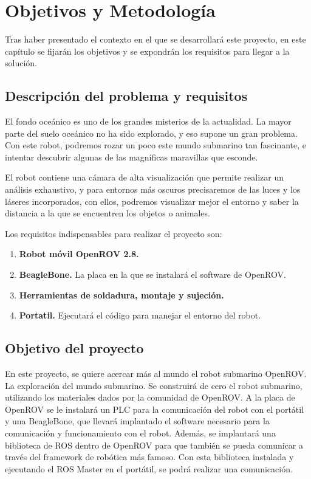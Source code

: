 \chapter{Objetivos y Metodología}
\label{cap:objetivos}
Tras haber presentado el contexto en el que se desarrollará este proyecto, en este capítulo se fijarán los objetivos y se expondrán los requisitos para llegar a la solución.
\section{Descripción del problema y requisitos}
\label{sec:descripciondelproblema}

El fondo oceánico es uno de los grandes misterios de la actualidad. La mayor parte del suelo oceánico no ha sido explorado, y eso supone un gran problema. Con este robot, podremos rozar un poco este mundo submarino tan fascinante, e intentar descubrir algunas de las magníficas maravillas que esconde.

El robot contiene una cámara de alta visualización que permite realizar un análisis exhaustivo, y para entornos más oscuros precisaremos de las luces y los láseres incorporados, con ellos, podremos visualizar mejor el entorno y saber la distancia a la que se encuentren los objetos o animales. 

Los requisitos indispensables para realizar el proyecto son:
\begin{enumerate}
\item \textbf{Robot móvil OpenROV 2.8.}
\item \textbf{BeagleBone.} La placa en la que se instalará el software de OpenROV.
\item \textbf{Herramientas de soldadura, montaje y sujeción.} 
\item \textbf{Portatil.} Ejecutará el código para manejar el entorno del robot.
\end{enumerate}

\section{Objetivo del proyecto}
\label{sec:objetivos}

En este proyecto, se quiere acercar más al mundo el robot submarino OpenROV. La exploración del mundo submarino. 
Se construirá de cero el robot submarino, utilizando los materiales dados por la comunidad de OpenROV. A la placa de OpenROV se le instalará un PLC para la comunicación del robot con el portátil y una BeagleBone, que llevará implantado el software necesario para la comunicación y funcionamiento con el robot.
Además, se implantará una biblioteca de ROS dentro de OpenROV para que también se pueda comunicar a través del framework de robótica más famoso. Con esta biblioteca instalada y ejecutando el ROS Master en el portátil, se podrá realizar una comunicación.

